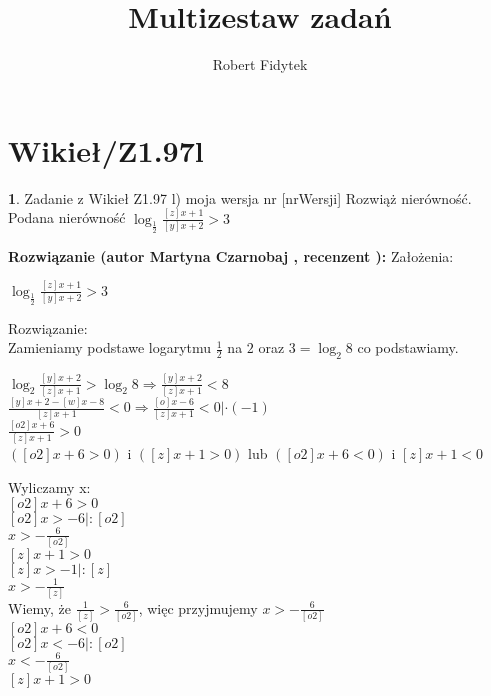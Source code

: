 \documentclass[12pt, a4paper]{article}
\title{Multizestaw zadań}
\author{Robert Fidytek}
\date{}
\theoremstyle{definition} %
\newtheorem{zad}{}
\newcommand{\kategoria}[1]{\section{#1}} %
\newcommand{\zadStart}[1]{\begin{zad}#1\newline} %
\newcommand{\zadStop}{\end{zad}}   %
\newcommand{\rozwStart}[2]{\noindent \textbf{Rozwiązanie (autor #1 , recenzent #2): }\newline} %
\begin{document}
\maketitle


\kategoria{Wikieł/Z1.97l}
\zadStart{Zadanie z Wikieł Z1.97 l) moja wersja nr [nrWersji]}
Rozwiąż nierówność.\\
Podana nierówność $ \log_\frac{1}{2} \frac{[z]x+1}{[y]x+2} > 3$\\
\zadStop
\rozwStart{Martyna Czarnobaj}{}
Założenia:\\
\begin{center}
	$ \log_\frac{1}{2} \frac{[z]x+1}{[y]x+2} > 3$\\
\end{center}
Rozwiązanie:\\
Zamieniamy podstawe logarytmu $ \frac{1}{2} $ na $ 2 $ oraz $ 3 = \log_2 8 $
co podstawiamy.\\
\begin{center}
	$ \log_2 \frac{[y]x+2}{[z]x+1} > \log_2 8 \Rightarrow \frac{[y]x+2}{[z]x+1} < 8 $\\
	$ \frac{[y]x+2-[w]x-8}{[z]x+1}<0 \Rightarrow \frac{[o]x-6}{[z]x+1} < 0 |\cdot (-1)$\\
	$ \frac{[o2]x+6}{[z]x+1} > 0 $\\
	$ ([o2]x + 6 > 0) $ i $ ([z]x + 1 > 0)$ lub $([o2]x + 6 < 0) $ i $ [z]x + 1 < 0 $\\	
\end{center}
Wyliczamy x:\\
\newline
$ [o2]x + 6 > 0 $\\
$ [o2]x > -6 |:[o2] $\\
$ x > -\frac{6}{[o2]} $\\
\newline
$ [z]x + 1 > 0 $\\
$ [z]x > -1 |:[z]$\\
$ x > -\frac{1}{[z]} $\\
\newline
Wiemy, że $ \frac{1}{[z]} > \frac{6}{[o2]} $, więc przyjmujemy $ x > -\frac{6}{[o2]} $\\
\newline
$ [o2]x + 6 < 0 $\\
$ [o2]x < -6 |:[o2] $\\
$ x < -\frac{6}{[o2]} $\\
\newline
$ [z]x + 1 > 0 $\\
\end{document}

